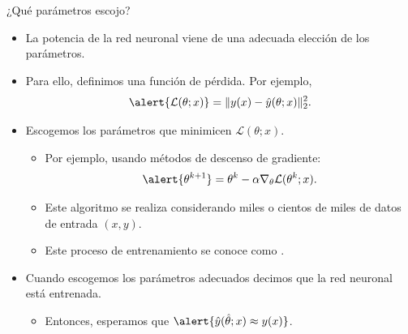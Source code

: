 \documentclass[
  unknownkeysallowed %
]{beamer}
\begin{document}
\begin{frame}{¿Qué parámetros escojo?}
  \begin{itemize}
    \item<1-> La potencia de la red neuronal viene de una adecuada elección de los parámetros.
    \item<2-> Para ello, definimos una función de pérdida. Por ejemplo,
    $$
    \alert{\mathcal{L}(\theta;x)}=\|y(x)-\hat y(\theta;x)\|_2^2.
    $$
    \item<2-> Escogemos los parámetros que minimicen $\mathcal{L}(\theta;x)$.
    \begin{itemize}
      \item Por ejemplo, usando métodos de descenso de gradiente:
      $$
        \alert{\theta^{k+1}} = \theta^k - \alpha\nabla_\theta \mathcal{L}(\theta^k;x).
      $$
      \item Este algoritmo se realiza considerando miles o cientos de miles de datos de entrada $(x,y)$.
      \item Este proceso de entrenamiento se conoce como .
    \end{itemize}
    \item<3-> Cuando escogemos los parámetros adecuados decimos que la red neuronal está entrenada.
    \begin{itemize}
      \item Entonces, esperamos que $\alert{\hat y(\hat \theta;x)\approx y(x)}$.
    \end{itemize}
  \end{itemize}
\end{frame}
\end{document}
